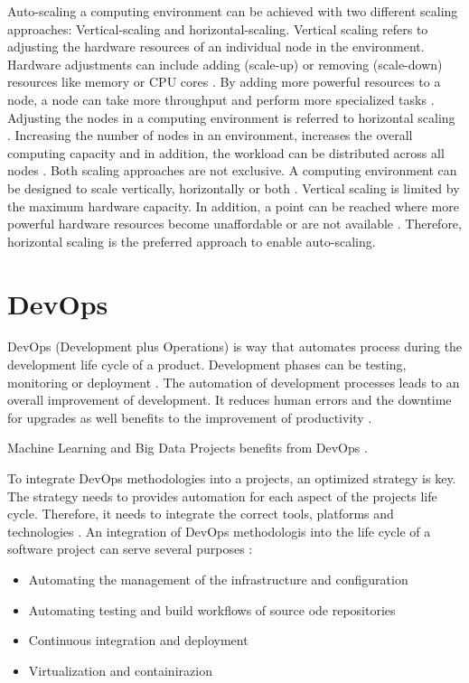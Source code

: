 Auto-scaling a computing environment can be achieved with two different scaling approaches: Vertical-scaling and horizontal-scaling.
Vertical scaling refers to adjusting the hardware resources of an individual node in the environment. Hardware adjustments can include adding (scale-up) or removing (scale-down) resources like memory or CPU cores \cite{Wilder2012CloudPatterns}. By adding more powerful resources to a node, a node can take more throughput and perform more specialized tasks \cite{Abbott2015ScalabilityArt}.
Adjusting the nodes in a computing environment is referred to horizontal scaling \cite{Wilder2012CloudPatterns}. Increasing the number of nodes in an environment, increases the overall computing capacity and in addition, the workload can be distributed across all nodes \cite{Wilder2012CloudPatterns, Abbott2015ScalabilityArt}.
Both scaling approaches are not exclusive. A computing environment can be designed to scale vertically, horizontally or both \cite{Wilder2012CloudPatterns}.
Vertical scaling is limited by the maximum hardware capacity. In addition, a point can be reached where more powerful hardware resources become unaffordable or are not available \cite{Abbot2011ScalabilityRules}.  Therefore, horizontal scaling is the preferred approach to enable auto-scaling.


\section{DevOps}
DevOps (Development plus Operations) is way that automates process during the development life cycle of a product. Development phases can be testing, monitoring or deployment \cite{Vadapalli2018DevOps}. 
The automation of development processes leads to an overall improvement of development. It reduces human errors and the downtime for upgrades as well benefits to the improvement of productivity \cite{Vadapalli2018DevOps}.


Machine Learning and Big Data Projects benefits from DevOps \cite{Vadapalli2018DevOps}.


To integrate DevOps methodologies into a projects, an optimized strategy is key. The strategy needs to provides automation for each aspect of the projects life cycle. Therefore, it needs to integrate the correct tools, platforms and technologies \cite{Vadapalli2018DevOps}.
An integration of DevOps methodologis into the life cycle of a software project can serve several purposes \cite{Vadapalli2018DevOps}:
\begin{itemize}
\item Automating the management of the infrastructure and configuration
\item Automating testing and build workflows of source ode repositories
\item Continuous integration and deployment
\item Virtualization and containirazion
\end{itemize}



